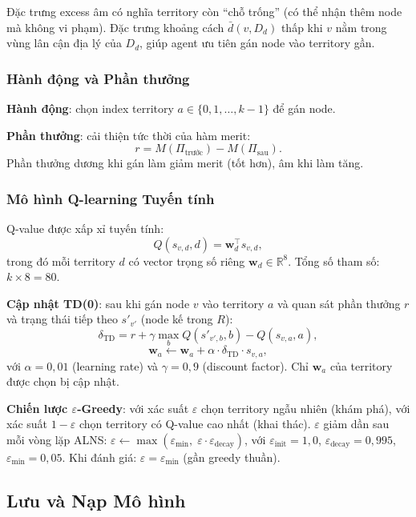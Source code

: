 \documentclass[12pt, a4paper]{article}
\begin{document}
Đặc trưng excess âm có nghĩa territory còn ``chỗ trống'' (có thể nhận thêm node
mà không vi phạm). Đặc trưng khoảng cách $\bar{d}(v, D_d)$ thấp khi $v$ nằm
trong vùng lân cận địa lý của $D_d$, giúp agent ưu tiên gán node vào territory gần.

\subsubsection{Hành động và Phần thưởng}

\textbf{Hành động}: chọn index territory $a \in \{0, 1, \ldots, k-1\}$ để gán node.

\textbf{Phần thưởng}: cải thiện tức thời của hàm merit:
\[
  r = M(\Pi_{\text{trước}}) - M(\Pi_{\text{sau}}).
\]
Phần thưởng dương khi gán làm giảm merit (tốt hơn), âm khi làm tăng.

\subsubsection{Mô hình Q-learning Tuyến tính}

Q-value được xấp xỉ tuyến tính:
\[
  Q(s_{v,d}, d) = \mathbf{w}_d^\top s_{v,d},
\]
trong đó mỗi territory $d$ có vector trọng số riêng $\mathbf{w}_d \in \mathbb{R}^8$.
Tổng số tham số: $k \times 8 = 80$.

\textbf{Cập nhật TD(0)}: sau khi gán node $v$ vào territory $a$ và quan sát
phần thưởng $r$ và trạng thái tiếp theo $s'_{v'}$ (node kế trong $R$):
\[
  \delta_{\text{TD}} = r + \gamma \max_{b} Q(s'_{v',b}, b) - Q(s_{v,a}, a),
\]
\[
  \mathbf{w}_a \leftarrow \mathbf{w}_a + \alpha \cdot \delta_{\text{TD}} \cdot s_{v,a},
\]
với $\alpha = 0{,}01$ (learning rate) và $\gamma = 0{,}9$ (discount factor).
Chỉ $\mathbf{w}_a$ của territory được chọn bị cập nhật.

\textbf{Chiến lược $\varepsilon$-Greedy}:
với xác suất $\varepsilon$ chọn territory ngẫu nhiên (khám phá), với xác suất
$1-\varepsilon$ chọn territory có Q-value cao nhất (khai thác).
$\varepsilon$ giảm dần sau mỗi vòng lặp ALNS:
$\varepsilon \leftarrow \max(\varepsilon_{\min},\; \varepsilon \cdot \varepsilon_{\text{decay}})$,
với $\varepsilon_{\text{init}} = 1{,}0$, $\varepsilon_{\text{decay}} = 0{,}995$,
$\varepsilon_{\min} = 0{,}05$.
Khi đánh giá: $\varepsilon = \varepsilon_{\min}$ (gần greedy thuần).

\subsection{Lưu và Nạp Mô hình}
\end{document}
